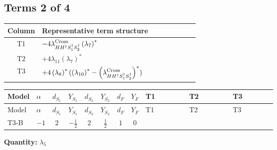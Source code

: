 \documentclass[8pt]{article}
\begin{document}
\begin{landscape}
\subsection*{Terms 2 of 4}
\begin{center}
\begin{tabular}{@{}c >{\raggedright\arraybackslash}p{0.82\linewidth}@{}}
\toprule
Column & Representative term structure \\
\midrule
T1 & \(\displaystyle -4 {\lambda_{H H^\dagger S_1^\dagger S_2^\dagger}^{\rm Cross}} \left({\lambda_{7}}\right)^{*}\) \\
\midrule
T2 & \(\displaystyle +4 {\lambda_{11}} \left({\lambda_{7}}\right)^{*}\) \\
\midrule
T3 & \(\displaystyle +4 \left({\lambda_{8}}\right)^{*} (\left({\lambda_{10}}\right)^{*}-\left({\lambda_{H H^\dagger S_1^\dagger S_2^\dagger}^{\rm Cross}}\right)^{*})\) \\
\midrule
\bottomrule
\end{tabular}
\end{center}
\smallskip
\tiny
\begin{longtable}{@{}llcccccc >{\raggedright\arraybackslash}p{0.21\linewidth} >{\raggedright\arraybackslash}p{0.21\linewidth} >{\raggedright\arraybackslash}p{0.21\linewidth}@{}}
\toprule
Model & $\alpha$ & $d_{S_1}$ & $Y_{S_1}$ & $d_{S_2}$ & $Y_{S_2}$ & $d_F$ & $Y_F$ & T1 & T2 & T3 \\
\midrule
\endfirsthead
\toprule
Model & $\alpha$ & $d_{S_1}$ & $Y_{S_1}$ & $d_{S_2}$ & $Y_{S_2}$ & $d_F$ & $Y_F$ & T1 & T2 & T3 \\
\midrule
\endhead
T3-B & $-1$ & $2$ & $-\frac{1}{2}$ & $2$ & $\frac{1}{2}$ & $1$ & $0$ & \scriptsize\adjustbox{max width=\linewidth}{$\begin{gathered} -4 {\lambda_{H H^\dagger S_1^\dagger S_2^\dagger}^{\rm Cross}} \left({\lambda_{7}}\right)^{*}\end{gathered}$} & \scriptsize\adjustbox{max width=\linewidth}{$\begin{gathered} +4 {\lambda_{11}} \left({\lambda_{7}}\right)^{*}\end{gathered}$} & \scriptsize\adjustbox{max width=\linewidth}{$\begin{gathered} +4 \left({\lambda_{8}}\right)^{*} (\left({\lambda_{10}}\right)^{*}-\left({\lambda_{H H^\dagger S_1^\dagger S_2^\dagger}^{\rm Cross}}\right)^{*})\end{gathered}$} \\
\midrule
\bottomrule
\end{longtable}
\clearpage
\noindent\textbf{Quantity: }$\lambda_5$\par\smallskip

\end{landscape}
\end{document}
